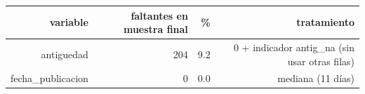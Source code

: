\begin{tabular}{rrrr}
\toprule
variable & faltantes en muestra final & \% & tratamiento \\
\midrule
antiguedad & 204 & 9.2 & 0 + indicador antig\_na (sin usar otras filas) \\
fecha\_publicacion & 0 & 0.0 & mediana (11 días) \\
\bottomrule
\end{tabular}
